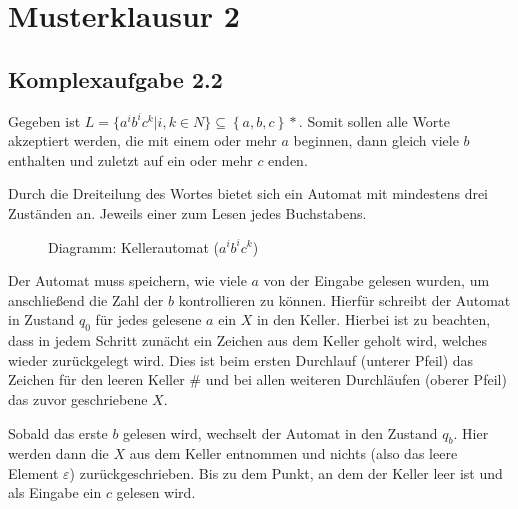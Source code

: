 \section{Musterklausur 2}
\label{sec:mk2}

\subsection{Komplexaufgabe 2.2}

Gegeben ist $L=\{ { a }^{ i }{ b }^{ i }{ c }^{ k }|i,k\in { N }\} \subseteq \left\{ a,b,c \right\} *$.
Somit sollen alle Worte akzeptiert werden, die mit einem oder mehr $a$ beginnen, dann gleich viele $b$ enthalten 
und zuletzt auf ein oder mehr $c$ enden.

Durch die Dreiteilung des Wortes bietet sich ein Automat mit mindestens drei Zuständen an. Jeweils einer zum 
Lesen jedes Buchstabens.

\begin{figure}[H]
\centering
{}
\caption{Diagramm: Kellerautomat ($a^ib^ic^k$)}
\label{fig:aibick}
\end{figure}

Der Automat muss speichern, wie viele $a$ von der Eingabe gelesen wurden, um anschließend die Zahl der $b$ 
kontrollieren zu können. Hierfür schreibt der Automat in Zustand $q_0$ für jedes gelesene $a$ ein $X$ in den Keller. Hierbei ist zu 
beachten, dass in jedem Schritt zunächt ein Zeichen aus dem Keller geholt wird, welches wieder zurückgelegt wird.
Dies ist beim ersten Durchlauf (unterer Pfeil) das Zeichen für den leeren Keller $\#$ 
und bei allen weiteren Durchläufen (oberer Pfeil) das zuvor geschriebene $X$.

Sobald das erste $b$ gelesen wird, wechselt der Automat in den Zustand $q_b$. Hier werden dann die $X$ aus dem Keller entnommen
und nichts (also das leere Element $\varepsilon$) zurückgeschrieben. Bis zu dem Punkt, an dem der Keller leer ist und als Eingabe ein $c$
gelesen wird.

